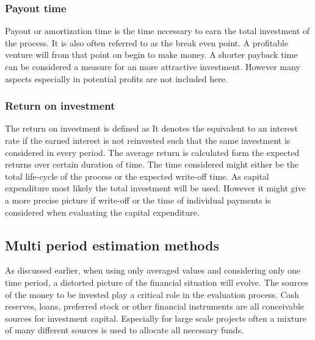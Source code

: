         \subsubsection{Payout time}
            Payout or amortization  time is the time necessary to earn the total investment of the process. It is also
            often referred to as the break even point. A profitable venture will from that point on begin to make money.
            A shorter payback time can be considered a measure for an more attractive investment.
            However many aspects especially in potential profits are not included here.

        \subsubsection{Return on investment}
            The return on investment is defined as
            It denotes the equivalent to an interest rate if the earned interest is not reinvested such that the same
            investment is considered in every period. The average return is calculated form the expected returns
            over certain duration of time. The time considered might either be the total life-cycle of the process or
            the expected write-off time. As capital expenditure most likely the total investment will be used. However
            it might give a more precise picture if write-off or the time of individual payments is considered when
            evaluating the capital expenditure.

    \subsection{Multi period estimation methods}
    \label{sec:MultiPeriod}
        As discussed earlier, when using only averaged values and considering only one time period,
        a distorted picture of the financial situation will evolve. The sources of the money to be invested
        play a critical role in the evaluation process. Cash reserves, loans, preferred stock or other financial
        instruments are all conceivable sources for investment capital. Especially for large scale projects often a
        mixture of many different sources is used to allocate all necessary funds.

